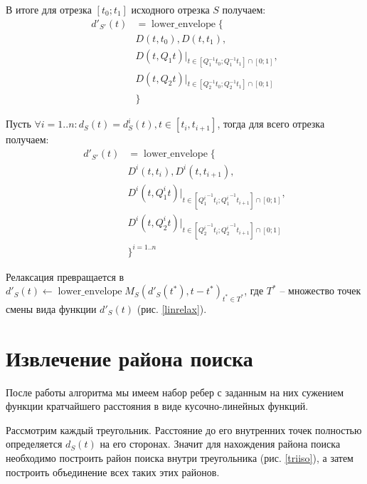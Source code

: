В итоге для отрезка $[t_0; t_1]$ исходного отрезка $S$ получаем:
\begin{equation}
\begin{aligned}
d'_{S'}(t) &= \mathop{lower\_envelope}\{\\
&D(t, t_0), D(t, t_1),\\
&D(t, Q_1t)|_{t \in [Q_1^{-1}t_0; Q_1^{-1}t_1] \cap [0; 1]},\\
&D(t, Q_2t)|_{t \in [Q_2^{-1}t_0; Q_2^{-1}t_1] \cap [0; 1]}\\
&\}
\end{aligned}
\end{equation}

Пусть $\forall i = 1..n: d_S(t) = d^i_S(t), t \in [t_i, t_{i+1}]$,
тогда для всего отрезка получаем:
\begin{equation}
\begin{aligned}
d'_{S'}(t) &= \mathop{lower\_envelope}\{\\
&D^i(t, t_i), D^i(t, t_{i+1}),\\
&D^i(t, Q^i_1t)|_{t \in [{Q^i_1}^{-1}t_i; {Q^i_1}^{-1}t_{i+1}] \cap [0; 1]},\\
&D^i(t, Q^i_2t)|_{t \in [{Q^i_2}^{-1}t_i; {Q^i_2}^{-1}t_{i+1}] \cap [0; 1]}\\
&\}^{i=1..n}
\end{aligned}
\end{equation}

Релаксация превращается в
$d'_S(t) \gets \mathop{lower\_envelope}{M_S(d'_S(t^*), t - t^*)}_{t^* \in T^*}$,
где $T^*$ -- множество точек смены вида функции $d'_S(t)$ (рис. \ref{linrelax}).


\FloatBarrier

\section{Извлечение района поиска}
После работы алгоритма мы имеем набор ребер с заданным
на них сужением функции кратчайшего расстояния в виде кусочно-линейных
функций.

Рассмотрим каждый треугольник. Расстояние до его внутренних точек
полностью определяется $d_S(t)$ на его сторонах. Значит для нахождения
района поиска необходимо построить район поиска внутри треугольника (рис. \ref{triiso}),
а затем построить объединение всех таких этих районов.


